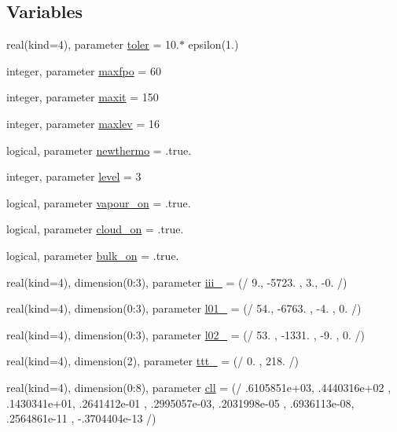 \subsection*{Variables}
\begin{DoxyCompactItemize}
\item 
real(kind=4), parameter \hyperlink{namespacetherm__lib_a4855f01e51a3fcf9e35d4f7d17156819}{toler} = 10.$\ast$ epsilon(1.)
\item 
integer, parameter \hyperlink{namespacetherm__lib_a726eec5f615e82a7ab9542aad323ff6b}{maxfpo} = 60
\item 
integer, parameter \hyperlink{namespacetherm__lib_af55ed6ff22d96d8e9778f1b9711a5f29}{maxit} = 150
\item 
integer, parameter \hyperlink{namespacetherm__lib_a4369cbefc67fc26498b97b24ca760dcd}{maxlev} = 16
\item 
logical, parameter \hyperlink{namespacetherm__lib_ac36c121987554589b16d515ddc351939}{newthermo} = .true.
\item 
integer, parameter \hyperlink{namespacetherm__lib_ace5c9fdd5940d4602568d9d3df5c930f}{level} = 3
\item 
logical, parameter \hyperlink{namespacetherm__lib_a7c4a4113d6d2548dd389c9eefce0396e}{vapour\+\_\+on} = .true.
\item 
logical, parameter \hyperlink{namespacetherm__lib_a7761745573e57bcf109498771693bc48}{cloud\+\_\+on} = .true.
\item 
logical, parameter \hyperlink{namespacetherm__lib_a74e34c886f54fe2ca038c4f301d31beb}{bulk\+\_\+on} = .true.
\item 
real(kind=4), dimension(0\+:3), parameter \hyperlink{namespacetherm__lib_af62776bc58906738f54b9b6be6b672d6}{iii\+\_} = (/ 9., -\/5723. , 3., -\/0. /)
\item 
real(kind=4), dimension(0\+:3), parameter \hyperlink{namespacetherm__lib_a32ef1fd4d35773be9ba1f5a7dbc13b6e}{l01\+\_} = (/ 54., -\/6763. , -\/4. , 0. /)
\item 
real(kind=4), dimension(0\+:3), parameter \hyperlink{namespacetherm__lib_adaf6c70605ef5072ebc0a71bb1189d99}{l02\+\_} = (/ 53. , -\/1331. , -\/9. , 0. /)
\item 
real(kind=4), dimension(2), parameter \hyperlink{namespacetherm__lib_afb689f706983009dfc62f3f4d0f85dc7}{ttt\+\_} = (/ 0. , 218. /)
\item 
real(kind=4), dimension(0\+:8), parameter \hyperlink{namespacetherm__lib_a0fd2184c73856d805e115f4a13068150}{cll} = (/ .\+6105851e+03, .\+4440316e+02 , .\+1430341e+01, .\+2641412e-\/01 , .\+2995057e-\/03, .\+2031998e-\/05 , .\+6936113e-\/08, .\+2564861e-\/11 , -\/.\+3704404e-\/13 /)

\end{DoxyCompactItemize}
